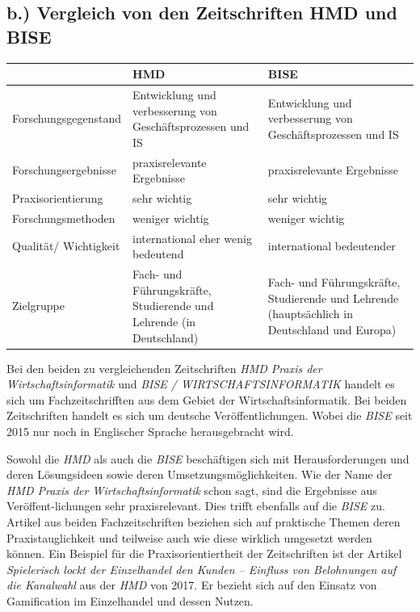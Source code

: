 \documentclass[12pt,utf8]{scrartcl}
\begin{document}
\begin{flushleft}
\subsection*{\label{sub2:einfuehrung}b.) Vergleich von den Zeitschriften HMD und BISE}

\begin{tabular}{|p{4cm}|p{5.5cm}|p{5.5cm}|}
\hline
& HMD & BISE \\
\hline
Forschungsgegenstand & Entwicklung und verbesserung von Geschäftsprozessen und IS & Entwicklung und verbesserung von Geschäftsprozessen und IS \\
\hline
Forschungsergebnisse & praxisrelevante Ergebnisse & praxisrelevante Ergebnisse \\
\hline
Praxisorientierung & sehr wichtig & sehr wichtig \\
\hline
Forschungsmethoden & weniger wichtig & weniger wichtig \\
\hline
Qualität/ Wichtigkeit & international eher wenig bedeutend & international bedeutender \\
\hline
Zielgruppe & Fach- und Führungskräfte, Studierende und Lehrende (in Deutschland) & Fach- und Führungskräfte, Studierende und Lehrende (hauptsächlich in Deutschland und Europa) \\
\hline
\end{tabular}
\newline
\newline
\newline

Bei den beiden zu vergleichenden Zeitschriften \emph{HMD Praxis der Wirtschaftsinformatik} und \emph{BISE / WIRTSCHAFTSINFORMATIK} handelt es sich um Fachzeitschrifften aus dem Gebiet der Wirtschaftsinformatik. Bei beiden Zeitschriften handelt es sich um deutsche Veröffentlichungen. Wobei die \emph{BISE} seit 2015 nur noch in Englischer Sprache herausgebracht wird\cite{BISE}.

Sowohl die \emph{HMD} als auch die \emph{BISE} beschäftigen sich mit Herausforderungen und deren Lösungsideen sowie deren Umsetzungsmöglichkeiten\cite{Meier2017}\cite{Stein2017}\cite{Ebert2017}. Wie der Name der \emph{HMD Praxis der Wirtschaftsinformatik} schon sagt, sind die Ergebnisse aus Veröffent-lichungen sehr praxisrelevant. Dies trifft ebenfalls auf die \emph{BISE} zu. Artikel aus beiden Fachzeitschriften beziehen sich auf praktische Themen deren Praxistauglichkeit und teilweise auch wie diese wirklich umgesetzt werden können\cite{Meier2017}\cite{Stein2017}\cite{Ebert2017}\cite{Kakar2017}. Ein Beispiel für die Praxisorientiertheit der Zeitschriften ist der Artikel \emph{Spielerisch lockt der Einzelhandel den Kunden – Einfluss von Belohnungen auf die Kanalwahl}\cite{Stein2017} aus der \emph{HMD} von 2017. Er bezieht sich auf den Einsatz von Gamification im Einzelhandel und dessen Nutzen. 


\end{flushleft}
\end{document}
